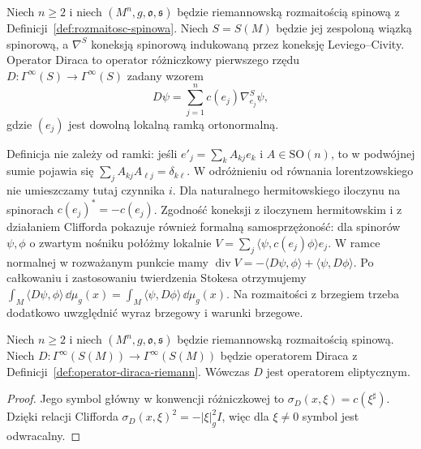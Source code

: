 \begin{definicja}
\label{def:operator-diraca-riemann}
Niech $n\geq2$ i niech $(M^n,g,\mathfrak o,\mathfrak s)$
będzie riemannowską rozmaitością spinową z
Definicji~\ref{def:rozmaitosc-spinowa}. Niech $S=S(M)$
będzie jej zespoloną wiązką spinorową, a $\nabla^S$
koneksją spinorową indukowaną przez koneksję
Leviego--Civity. Operator Diraca to operator różniczkowy
pierwszego rzędu $D:\Gamma^\infty(S)\to\Gamma^\infty(S)$
zadany wzorem
\begin{equation}\label{eq:dirac-riemann}
 D\psi=\sum_{j=1}^n c(e_j)\nabla^S_{e_j}\psi,
\end{equation}
gdzie $(e_j)$ jest dowolną lokalną ramką ortonormalną.
\end{definicja}

Definicja nie zależy od ramki: jeśli $e'_j=\sum_k A_{kj}e_k$
i $A\in\mathrm{SO}(n)$, to w podwójnej sumie
pojawia się $\sum_jA_{kj}A_{\ell j}=\delta_{k\ell}$.
W odróżnieniu od równania lorentzowskiego
nie umieszczamy tutaj czynnika $i$. Dla naturalnego
hermitowskiego iloczynu na spinorach $c(e_j)^*=-c(e_j)$.
Zgodność koneksji z iloczynem hermitowskim i
z działaniem Clifforda pokazuje również formalną
samosprzężoność: dla spinorów $\psi,\phi$ o zwartym
nośniku połóżmy lokalnie
$V=\sum_j\langle\psi,c(e_j)\phi\rangle e_j$.
W ramce normalnej w rozważanym punkcie mamy
$\operatorname{div}V=
-\langle D\psi,\phi\rangle+
\langle\psi,D\phi\rangle$.
Po całkowaniu i zastosowaniu twierdzenia Stokesa
otrzymujemy
$\int_M\langle D\psi,\phi\rangle\,\dd\mu_g(x)
=\int_M\langle\psi,D\phi\rangle\,\dd\mu_g(x)$.
Na rozmaitości z brzegiem trzeba dodatkowo uwzględnić
wyraz brzegowy i warunki brzegowe.

\begin{stwierdzenie}[Eliptyczność]
\label{prop:dirac-eliptycznosc}
Niech $n\geq2$ i niech $(M^n,g,\mathfrak o,\mathfrak s)$
będzie riemannowską rozmaitością spinową. Niech
$D:\Gamma^\infty(S(M))\to\Gamma^\infty(S(M))$
będzie operatorem Diraca z
Definicji~\ref{def:operator-diraca-riemann}.
Wówczas $D$ jest operatorem eliptycznym.
\end{stwierdzenie}
\begin{proof}
Jego symbol główny w konwencji różniczkowej to
$\sigma_D(x,\xi)=c(\xi^\sharp)$.
Dzięki relacji Clifforda
$\sigma_D(x,\xi)^2=-|\xi|_g^2I$, więc dla
$\xi\ne0$ symbol jest odwracalny.
\end{proof}

